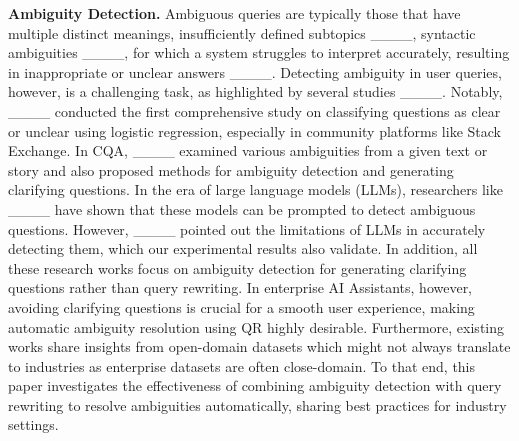 \textbf{Ambiguity Detection.} 
\label{sec:related_work}
Ambiguous queries are typically those that have multiple distinct meanings, insufficiently defined subtopics ____, syntactic ambiguities ____, for which a system struggles to interpret accurately, resulting in inappropriate or unclear answers ____. Detecting ambiguity in user queries, however, is a challenging task, as highlighted by several studies ____. Notably, ____ conducted the first comprehensive study on classifying questions as clear or unclear using logistic regression, especially in community platforms like Stack Exchange.
In CQA, ____ examined various ambiguities from a given text or story and also proposed methods for ambiguity detection and generating clarifying questions. 
In the era of large language models (LLMs), researchers like ____ have shown that these models can be prompted to detect ambiguous questions. However, ____ pointed out the limitations of LLMs in accurately detecting them, which our experimental results also validate. 
In addition, all these research works focus on ambiguity detection for generating clarifying questions rather than query rewriting. In enterprise AI Assistants, however, avoiding clarifying questions is crucial for a smooth user experience, making automatic ambiguity resolution using QR
highly desirable. Furthermore, existing works share insights from open-domain datasets which might not always translate to industries as enterprise datasets are often close-domain. To that end, this paper investigates the effectiveness of combining ambiguity detection with query rewriting to resolve ambiguities automatically, sharing best practices for industry settings.